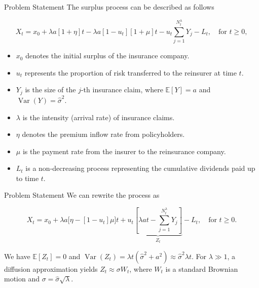 \documentclass{beamer}
\theoremstyle{definition}
\newcommand{\E}{\mathbb{E}}
\DeclareMathOperator{\Var}{Var}
\begin{document}
\begin{frame}{Problem Statement}
The surplus process can be described as follows

\begin{equation}
    X_t = x_0 + \lambda a [1 + \eta] t - \lambda a [1 - u_t] [1 + \mu] t - u_t \sum_{j=1}^{N_t^{\lambda}} Y_j - L_t, \quad \text{for } t \ge 0,
    \label{eq:surplus_process}
\end{equation}

\begin{itemize}
    \item $x_0$ denotes the initial surplus of the insurance company.
    
    \item $u_t$ represents the proportion of risk transferred to the reinsurer at time $t$.
    
    \item $Y_j$ is the size of the $j$-th insurance claim, where $\E[Y] = a$ and $\Var(Y) = \widehat{\sigma}^2$.
    
    \item $\lambda$ is the intensity (arrival rate) of insurance claims.
    
    \item $\eta$ denotes the premium inflow rate from policyholders.
    
    \item $\mu$ is the payment rate from the insurer to the reinsurance company.
    
    \item $L_t$ is a non-decreasing process representing the cumulative dividends paid up to time $t$.
\end{itemize}



\end{frame}

\begin{frame}{Problem Statement}
We can rewrite the process as

\[
X_t = x_0 + \lambda a \bigl[ \eta - [1 - u_t] \mu \bigr] t + u_t 
    \underbrace{\left[ \lambda a t - \sum_{j=1}^{N_t^\lambda} Y_j \right]}_{Z_t} - L_t, 
    \quad \text{for } t \ge 0.
\]

We have \(\E[Z_t]=0\) and \(\Var(Z_t)=\lambda t(\widehat{\sigma}^2+a^2)\approx \widehat{\sigma}^2\lambda t\). For \(\lambda \gg 1\), a diffusion approximation yields \(Z_t \approx \sigma W_t\), where \(W_t\) is a standard Brownian motion and \(\sigma = \widehat{\sigma}\sqrt{\lambda}\).
\end{frame}
\end{document}
